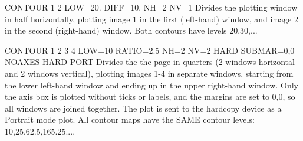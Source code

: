 \begin{example}
  \item[CONTOUR 1 2 LOW=20. DIFF=10. NH=2 NV=1\hfill]{
Divides the plotting window in half horizontally, plotting image
        1 in the first (left-hand) window, and image 2 in the second 
        (right-hand) window.  Both contours have levels 20,30,...}
  \item[CONTOUR 1 2 3 4 LOW=10 RATIO=2.5 NH=2 NV=2 HARD SUBMAR=0,0 NOAXES HARD PORT\hfill]{
Divides the the page in quarters (2 windows horizontal and 2 windows
        vertical), plotting images 1-4 in separate windows, starting from
        the lower left-hand window and ending up in the upper right-hand
        window.  Only the axis box is plotted without ticks or labels, and
        the margins are set to 0,0, so all windows are joined together.
        The plot is sent to the hardcopy device as a Portrait mode plot.
All contour maps have the SAME contour levels: 10,25,62.5,165.25....}
\end{example}


